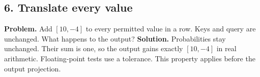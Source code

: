 \subsection*{6. Translate every value}
\textbf{Problem.} Add $[10,-4]$ to every permitted value in a row.
Keys and query are unchanged. What happens to the output?
\textbf{Solution.} Probabilities stay unchanged. Their sum is one, so
the output gains exactly $[10,-4]$ in real arithmetic. Floating-point
tests use a tolerance. This property applies before the output projection.
